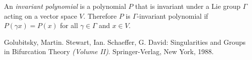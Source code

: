 \documentclass[12pt]{article}
\begin{document}
An \emph{invariant polynomial} is a polynomial $P$ that is invariant under a  Lie group $\Gamma$ acting on a vector space $V$.  Therefore $P$ is $\Gamma$-invariant polynomial if $P(\gamma x) = P(x)$ for all $\gamma \in \Gamma$ and $x \in V$.
\begin{thebibliography}{1}
 Golubitsky, Martin. Stewart, Ian. Schaeffer, G. David: Singularities and Groups in Bifurcation Theory \textit{(Volume II)}. Springer-Verlag, New York, 1988.
\end{thebibliography}
\end{document}
